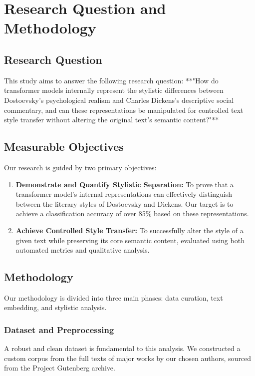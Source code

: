 \documentclass[sn-mathphys]{sn-jnl}%
\begin{document}
\section{Research Question and Methodology}\label{sec2}

\subsection{Research Question}\label{subsec2.1}
This study aims to answer the following research question: **"How do transformer models internally represent the stylistic differences between Dostoevsky's psychological realism and Charles Dickens's descriptive social commentary, and can these representations be manipulated for controlled text style transfer without altering the original text's semantic content?"**

\subsection{Measurable Objectives}\label{subsec2.2}
Our research is guided by two primary objectives:
\begin{enumerate}
    \item \textbf{Demonstrate and Quantify Stylistic Separation:} To prove that a transformer model's internal representations can effectively distinguish between the literary styles of Dostoevsky and Dickens. Our target is to achieve a classification accuracy of over 85\% based on these representations.
    \item \textbf{Achieve Controlled Style Transfer:} To successfully alter the style of a given text while preserving its core semantic content, evaluated using both automated metrics and qualitative analysis.
\end{enumerate}

\subsection{Methodology}\label{subsec2.3}
Our methodology is divided into three main phases: data curation, text embedding, and stylistic analysis.

\subsubsection{Dataset and Preprocessing}\label{subsubsec2.3.1}
A robust and clean dataset is fundamental to this analysis. We constructed a custom corpus from the full texts of major works by our chosen authors, sourced from the Project Gutenberg archive.
\end{document}
